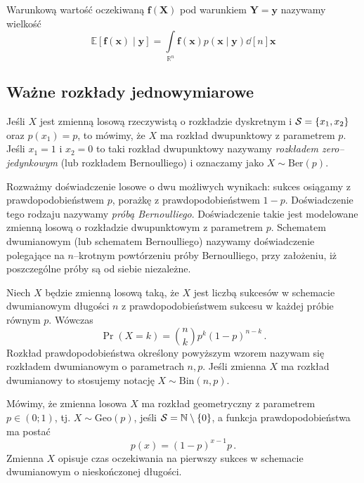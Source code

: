 \documentclass{myclass}
\numberwithin{equation}{subsection}
\begin{document}
\begin{definition}
Warunkową wartość oczekiwaną \(\bm{f}(\bm{X})\) pod warunkiem \(\bm{Y} = \bm{y}\) nazywamy wielkość
\[
\mathbb{E}[\bm{f}(\bm{x}) \mid \bm{y}] = \int\limits_{\mathbb{R}^n} \bm{f}(\bm{x}) p(\bm{x} \mid \bm{y}) \dd[n]{\bm{x}}
\]
\end{definition}


\subsection{Ważne rozkłady jednowymiarowe}

\begin{definition}
Jeśli \(X\) jest zmienną losową rzeczywistą o rozkładzie dyskretnym i \(\mathcal{S} = \{x_1, x_2\}\) oraz
\(p(x_1) = p\), to mówimy, że \(X\) ma rozkład dwupunktowy z parametrem \(p\). Jeśli \(x_1 = 1\) i
\(x_2 = 0\) to taki rozkład dwupunktowy nazywamy \emph{rozkładem zero--jedynkowym} (lub rozkładem
Bernoulliego) i oznaczamy jako \(X \sim \mathrm{Ber}(p)\).
\end{definition}

\begin{definition}
Rozważmy doświadczenie losowe o dwu możliwych wynikach: sukces osiągamy z prawdopodobieństwem \(p\),
porażkę z prawdopodobieństwem \(1-p\). Doświadczenie tego rodzaju nazywamy \emph{próbą
Bernoulliego}. Doświadczenie takie jest modelowane zmienną losową o rozkładzie dwupunktowym z
parametrem \(p\). Schematem dwumianowym (lub schematem Bernoulliego) nazywamy doświadczenie
polegające na \(n\)--krotnym powtórzeniu próby Bernoulliego, przy założeniu, iż poszczególne próby
są od siebie niezależne.
\end{definition}

\begin{definition}
Niech \(X\) będzie zmienną losową taką, że \(X\) jest liczbą sukcesów w schemacie dwumianowym
długości \(n\) z prawdopodobieństwem sukcesu w każdej próbie równym \(p\). Wówczas
\[
\Pr(X = k) = {n \choose k} p^k (1 - p)^{n-k}\,.
\]
Rozkład prawdopodobieństwa określony powyższym wzorem nazywam się rozkładem dwumianowym o
parametrach \(n,p\). Jeśli zmienna \(X\) ma rozkład dwumianowy to stosujemy notację \(X \sim
\mathrm{Bin}(n,p)\).
\end{definition}

\begin{definition}
Mówimy, że zmienna losowa \(X\) ma rozkład geometryczny z parametrem \(p \in (0;1)\), tj. \(X \sim
\mathrm{Geo}(p)\), jeśli \(\mathcal{S} = \mathbb{N} \setminus \{0\}\), a funkcja prawdopodobieństwa ma
postać
\[
p(x) = (1-p)^{x-1}p\,.
\]
Zmienna \(X\) opisuje czas oczekiwania na pierwszy sukces w schemacie dwumianowym o nieskończonej
długości.
\end{definition}
\end{document}

